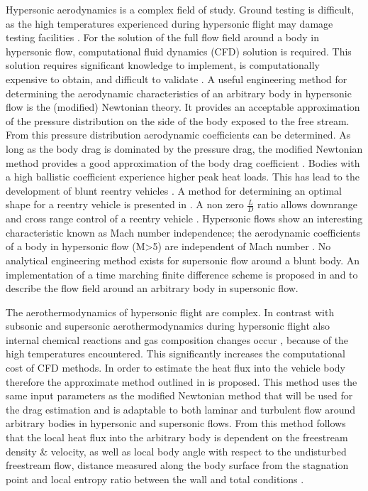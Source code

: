 Hypersonic aerodynamics is a complex field of study. Ground testing is difficult, as the high temperatures experienced during hypersonic flight may damage testing facilities \cite{AndersonJr.2006} \cite{Bertin1994}. For the solution of the full flow field around a body in hypersonic flow, computational fluid dynamics (CFD) solution is required. This solution requires significant knowledge to implement, is computationally expensive to obtain, and difficult to validate \cite{AndersonJr.2006} \cite{Bertin1994}. A useful engineering method for determining the aerodynamic characteristics of an arbitrary body in hypersonic flow is the (modified) Newtonian theory. It provides an acceptable approximation of the pressure distribution on the side of the body exposed to the free stream. From this pressure distribution aerodynamic coefficients can be determined. As long as the body drag is dominated by the pressure drag, the modified Newtonian method provides a good approximation of the body drag coefficient \cite{AndersonJr.2006} \cite{Bertin1994} \cite{Bertin2006}. Bodies with a high ballistic coefficient experience higher peak heat loads. This has lead to the development of blunt reentry vehicles\cite{Bertin1994} \cite{Theisinger2009}. A method for determining an optimal shape for a reentry vehicle is presented in \cite{Theisinger2009}. A non zero $\frac{L}{D}$ ratio allows downrange and cross range control of a reentry vehicle \cite{Theisinger2009}. Hypersonic flows show an interesting characteristic known as Mach number independence; the aerodynamic coefficients of a body in hypersonic flow (M>5) are independent of Mach number \cite{Bertin1994,AndersonJr.2007,Hollis}. No analytical engineering method exists for supersonic flow around a blunt body. An implementation of a time marching finite difference scheme is proposed in \cite{AndersonJr.2007} and \cite{AndersonJr.2006} to describe the flow field around an arbitrary body in supersonic flow. 

The aerothermodynamics of hypersonic flight are complex. In contrast with subsonic and supersonic aerothermodynamics during hypersonic flight also internal chemical reactions and gas composition changes occur \cite{AndersonJr.2006}, because of the high temperatures encountered. This significantly increases the computational cost of CFD methods. In order to estimate the heat flux into the vehicle body therefore the approximate method outlined in \cite{Tauber1986} \cite{AndersonJr.2006} is proposed. This method uses the same input parameters as the modified Newtonian method that will be used for the drag estimation and is adaptable to both laminar and turbulent flow around arbitrary bodies in hypersonic and supersonic flows. From this method follows that the local heat flux into the arbitrary body is dependent on the freestream density \& velocity, as well as local body angle with respect to the undisturbed freestream flow, distance measured along the body surface from the stagnation point and local entropy ratio between the wall and total conditions \cite{Tauber1986} \cite{AndersonJr.2006}.